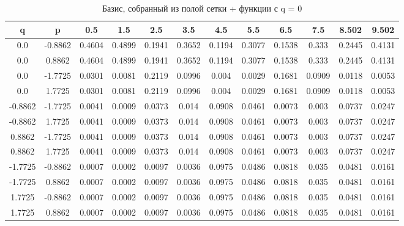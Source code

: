 \documentclass[a4paper,14pt]{extarticle}
\begin{document}
\begin{landscape}
\begin{table}[H]
\centering
\caption{Базис, собранный из полой сетки + функции с q = 0}
\begin{tabular}{|c|c|*{10}{c}|}
\hline
q       & p       & 0.5    & 1.5    & 2.5    & 3.5    & 4.5    & 5.5    & 6.5    & 7.5    & 8.502  & 9.502  \\ 
\hline                                                                                                      
0.0     & -0.8862 & 0.4604 & 0.4899 & 0.1941 & 0.3652 & 0.1194 & 0.3077 & 0.1538 & 0.333  & 0.2445 & 0.4131 \\ 
0.0     & 0.8862  & 0.4604 & 0.4899 & 0.1941 & 0.3652 & 0.1194 & 0.3077 & 0.1538 & 0.333  & 0.2445 & 0.4131 \\ 
0.0     & -1.7725 & 0.0301 & 0.0081 & 0.2119 & 0.0996 & 0.004  & 0.0029 & 0.1681 & 0.0909 & 0.0118 & 0.0053 \\ 
0.0     & 1.7725  & 0.0301 & 0.0081 & 0.2119 & 0.0996 & 0.004  & 0.0029 & 0.1681 & 0.0909 & 0.0118 & 0.0053 \\ 
-0.8862 & -1.7725 & 0.0041 & 0.0009 & 0.0373 & 0.014  & 0.0908 & 0.0461 & 0.0073 & 0.003  & 0.0737 & 0.0247 \\ 
-0.8862 & 1.7725  & 0.0041 & 0.0009 & 0.0373 & 0.014  & 0.0908 & 0.0461 & 0.0073 & 0.003  & 0.0737 & 0.0247 \\ 
0.8862  & -1.7725 & 0.0041 & 0.0009 & 0.0373 & 0.014  & 0.0908 & 0.0461 & 0.0073 & 0.003  & 0.0737 & 0.0247 \\ 
0.8862  & 1.7725  & 0.0041 & 0.0009 & 0.0373 & 0.014  & 0.0908 & 0.0461 & 0.0073 & 0.003  & 0.0737 & 0.0247 \\ 
-1.7725 & -0.8862 & 0.0007 & 0.0002 & 0.0097 & 0.0036 & 0.0975 & 0.0486 & 0.0818 & 0.035  & 0.0481 & 0.0161 \\ 
-1.7725 & 0.8862  & 0.0007 & 0.0002 & 0.0097 & 0.0036 & 0.0975 & 0.0486 & 0.0818 & 0.035  & 0.0481 & 0.0161 \\ 
1.7725  & -0.8862 & 0.0007 & 0.0002 & 0.0097 & 0.0036 & 0.0975 & 0.0486 & 0.0818 & 0.035  & 0.0481 & 0.0161 \\ 
1.7725  & 0.8862  & 0.0007 & 0.0002 & 0.0097 & 0.0036 & 0.0975 & 0.0486 & 0.0818 & 0.035  & 0.0481 & 0.0161 \\ 
\hline
\end{tabular}
\end{table} 


\end{landscape}
\end{document}
